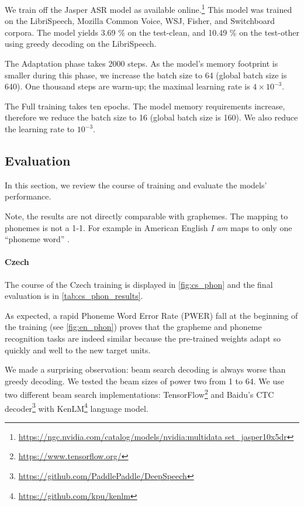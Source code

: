 We train off the Jasper ASR model as available online.\footnote{\url{https://ngc.nvidia.com/catalog/models/nvidia:multidata set\_jasper10x5dr}} This model was trained on the LibriSpeech, Mozilla Common Voice, WSJ, Fisher, and Switchboard corpora. The model yields 3.69 \% on the test-clean, and 10.49 \% on the test-other using greedy decoding on the LibriSpeech.

The Adaptation phase takes 2000 steps. As the model's memory footprint is smaller during this phase, we increase the batch size to 64 (global batch size is 640). One thousand steps are warm-up; the maximal learning rate is $4 \times 10^{-3}$.

The Full training takes ten epochs. The model memory requirements increase, therefore we reduce the batch size to 16 (global batch size is 160). We also reduce the learning rate to $10^{-3}$.

\subsection{Evaluation}
\label{asr:phon:eval}
In this section, we review the course of training and evaluate the models' performance.

Note, the results are not directly comparable with graphemes. The mapping to phonemes is not a 1-1. For example in American English \emph{I am} maps to only one ``phoneme word'' \textipa{[aI\ae m]}.

\paragraph{Czech}
The course of the Czech training is displayed in \cref{fig:cs_phon} and the final evaluation is in \cref{tab:cs_phon_results}. 

As expected, a rapid Phoneme Word Error Rate (PWER) fall at the beginning of the training (see \cref{fig:en_phon}) proves that the grapheme and phoneme recognition tasks are indeed similar because the pre-trained weights adapt so quickly and well to the new target units.

We made a surprising observation: beam search decoding is always worse than greedy decoding. We tested the beam sizes of power two from 1 to 64. We use two different beam search implementations: TensorFlow\footnote{\url{https://www.tensorflow.org/}} and Baidu's CTC decoder\footnote{\url{https://github.com/PaddlePaddle/DeepSpeech}} with KenLM\footnote{\url{https://github.com/kpu/kenlm}} language model. 

